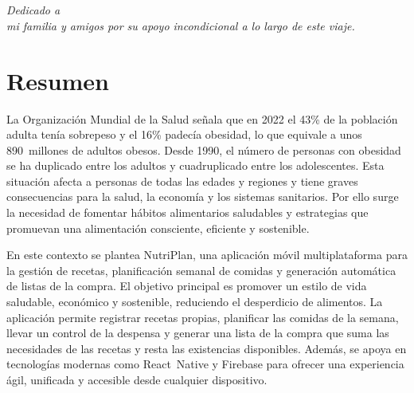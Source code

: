 \documentclass[twoside, openright, 11pt]{report}
\begin{document}
\chapter*{}
\begin{flushright}
\textit{Dedicado a \\
mi familia y amigos por su apoyo incondicional a lo largo de este viaje.\\}
\end{flushright}
\thispagestyle{empty}

\chapter*{Resumen}
\thispagestyle{empty}

La Organización Mundial de la Salud señala que en 2022 el 43\% de la población adulta tenía sobrepeso y el 16\% padecía obesidad, lo que equivale a unos 890 millones de adultos obesos\cite{OMSObesidadySobrepeso}. Desde 1990, el número de personas con obesidad se ha duplicado entre los adultos y cuadruplicado entre los adolescentes\cite{ONUAAComercioAlimentosyObesidad}. Esta situación afecta a personas de todas las edades y regiones y tiene graves consecuencias para la salud, la economía y los sistemas sanitarios. Por ello surge la necesidad de fomentar hábitos alimentarios saludables y estrategias que promuevan una alimentación consciente, eficiente y sostenible.

\medskip

En este contexto se plantea NutriPlan, una aplicación móvil multiplataforma para la gestión de recetas, planificación semanal de comidas y generación automática de listas de la compra. El objetivo principal es promover un estilo de vida saludable, económico y sostenible, reduciendo el desperdicio de alimentos. La aplicación permite registrar recetas propias, planificar las comidas de la semana, llevar un control de la despensa y generar una lista de la compra que suma las necesidades de las recetas y resta las existencias disponibles. Además, se apoya en tecnologías modernas como React Native y Firebase para ofrecer una experiencia ágil, unificada y accesible desde cualquier dispositivo.
\end{document}
